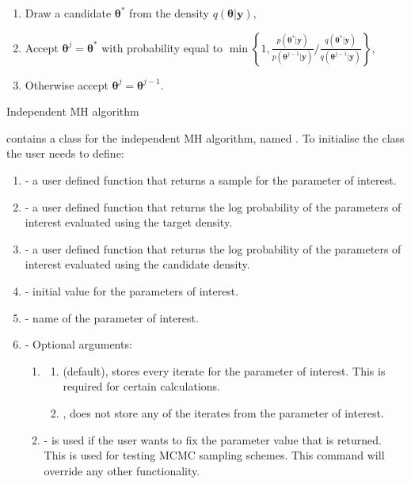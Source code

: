 \documentclass[article]{jss}
\begin{document}
%
\begin{algorithm}[H]
\begin{enumerate}
\item Draw a candidate $\bm{\bm{\theta}}^{\ast}$ from the density $q\left(\bm{\bm{\theta}}|\bm{y}\right),$ 
\item Accept $\bm{\theta}^{j}=\bm{\theta}^{\ast}$ with probability equal
to $\min\left\{ 1,\frac{p\left(\bm{\theta}^{\ast}|\bm{y}\right)}{p\left(\bm{\theta}^{j-1}|\bm{y}\right)}/\frac{q\left(\bm{\theta}^{\ast}|\bm{y}\right)}{q\left(\bm{\theta}^{j-1}|\bm{y}\right)}\right\} ,$ 
\item Otherwise accept $\bm{\theta}^{j}=\bm{\theta}^{j-1}.$ 
\end{enumerate}
\caption{Independent MH algorithm}
\label{alg:IMH}
\end{algorithm}


 contains a class for the independent MH algorithm, named .
To initialise the class the user needs to define: 
\begin{enumerate}
\item {} - a user defined function that returns a sample for the
  parameter of interest.
\item {} - a user defined function that returns the log
  probability of the parameters of interest evaluated using the target
  density.
\item {} - a user defined function that returns the log
  probability of the parameters of interest evaluated using the
  candidate density.
\item {} - initial value for the parameters of interest.
\item {} - name of the parameter of interest.
\item {}- Optional arguments:

\begin{enumerate}
\item {}
  \begin{enumerate}
  \item {} (default), stores every iterate for the parameter
    of interest. This is required for certain calculations.
  \item {}, does not store any of the iterates from the parameter
    of interest.
  \end{enumerate}
\item {} - is used if the user wants to fix the
    parameter value that is returned. This is used for testing MCMC
    sampling schemes.  This command will override any other
    functionality.
  \end{enumerate}
\end{enumerate}
\end{document}
